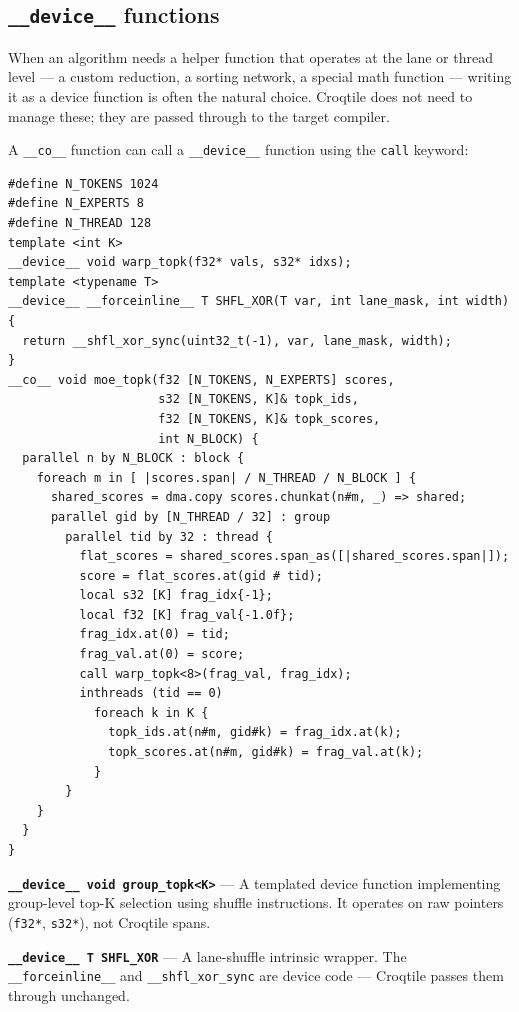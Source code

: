 \subsection*{\texttt{\_\_device\_\_} functions}

When an algorithm needs a helper function that operates at the lane or thread level --- a custom reduction, a sorting network, a special math function --- writing it as a device function is often the natural choice. Croqtile does not need to manage these; they are passed through to the target compiler.

A \texttt{\_\_co\_\_} function can call a \texttt{\_\_device\_\_} function using the \texttt{call} keyword:

\begin{lstlisting}[language=croqtile,caption={device functions}]
#define N_TOKENS 1024
#define N_EXPERTS 8
#define N_THREAD 128
template <int K>
__device__ void warp_topk(f32* vals, s32* idxs);
template <typename T>
__device__ __forceinline__ T SHFL_XOR(T var, int lane_mask, int width) {
  return __shfl_xor_sync(uint32_t(-1), var, lane_mask, width);
}
__co__ void moe_topk(f32 [N_TOKENS, N_EXPERTS] scores,
                     s32 [N_TOKENS, K]& topk_ids,
                     f32 [N_TOKENS, K]& topk_scores,
                     int N_BLOCK) {
  parallel n by N_BLOCK : block {
    foreach m in [ |scores.span| / N_THREAD / N_BLOCK ] {
      shared_scores = dma.copy scores.chunkat(n#m, _) => shared;
      parallel gid by [N_THREAD / 32] : group
        parallel tid by 32 : thread {
          flat_scores = shared_scores.span_as([|shared_scores.span|]);
          score = flat_scores.at(gid # tid);
          local s32 [K] frag_idx{-1};
          local f32 [K] frag_val{-1.0f};
          frag_idx.at(0) = tid;
          frag_val.at(0) = score;
          call warp_topk<8>(frag_val, frag_idx);
          inthreads (tid == 0)
            foreach k in K {
              topk_ids.at(n#m, gid#k) = frag_idx.at(k);
              topk_scores.at(n#m, gid#k) = frag_val.at(k);
            }
        }
    }
  }
}
\end{lstlisting}

\textbf{\texttt{\_\allowbreak{}\_\allowbreak{}device\_\allowbreak{}\_\allowbreak{} void group\_\allowbreak{}topk\textless{}K\textgreater{}}} --- A templated device function implementing group-level top-K selection using shuffle instructions. It operates on raw pointers (\texttt{f32*}, \texttt{s32*}), not Croqtile spans.

\textbf{\texttt{\_\allowbreak{}\_\allowbreak{}device\_\allowbreak{}\_\allowbreak{} T SHFL\_\allowbreak{}XOR}} --- A lane-shuffle intrinsic wrapper. The \texttt{\_\allowbreak{}\_\allowbreak{}forceinline\_\allowbreak{}\_\allowbreak{}} and \texttt{\_\allowbreak{}\_\allowbreak{}shfl\_\allowbreak{}xor\_\allowbreak{}sync} are device code --- Croqtile passes them through unchanged.

